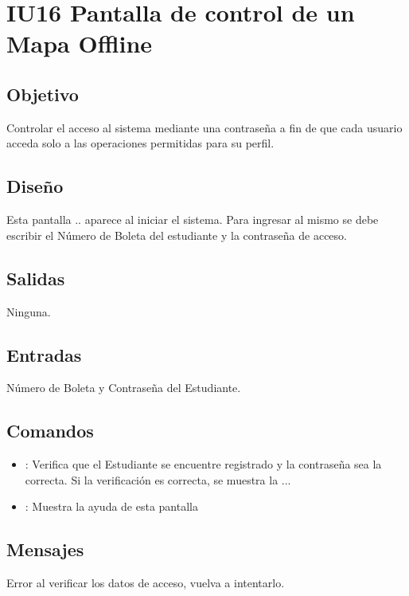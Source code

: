 \section{IU16 Pantalla de control de un Mapa Offline}

\subsection{Objetivo}
	Controlar el acceso al sistema mediante una contraseña a fin de que cada usuario acceda solo a las operaciones permitidas para su perfil.

\subsection{Diseño}
	Esta pantalla .. aparece al iniciar el sistema. Para ingresar al mismo se debe escribir el Número de Boleta del estudiante y la contraseña de acceso. 

\subsection{Salidas}

	Ninguna.

\subsection{Entradas}
Número de Boleta y Contraseña del Estudiante.

\subsection{Comandos}
\begin{itemize}
	\item {}: Verifica que el Estudiante se encuentre registrado y la contraseña sea la correcta. Si la verificación es correcta, se muestra la ...
	\item {}: Muestra la ayuda de esta pantalla %
\end{itemize}

\subsection{Mensajes}

\begin{Citemize}
	\item Error al verificar los datos de acceso, vuelva a intentarlo.
\end{Citemize}

\clearpage